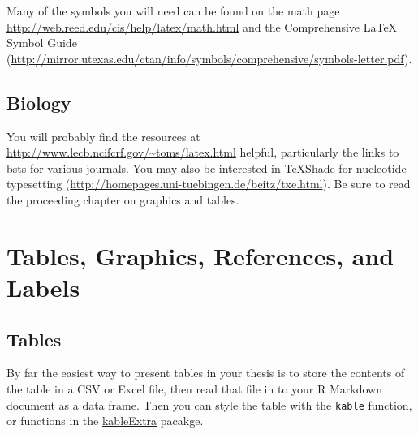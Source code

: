 \documentclass [11pt, proquest] {uwthesis}[2015/03/03]
\begin{document}
Many of the symbols you will need can be found on the math page \url{http://web.reed.edu/cis/help/latex/math.html} and the Comprehensive LaTeX Symbol Guide (\url{http://mirror.utexas.edu/ctan/info/symbols/comprehensive/symbols-letter.pdf}).

\hypertarget{biology}{%
\section{Biology}\label{biology}}

You will probably find the resources at \url{http://www.lecb.ncifcrf.gov/~toms/latex.html} helpful, particularly the links to bsts for various journals. You may also be interested in TeXShade for nucleotide typesetting (\url{http://homepages.uni-tuebingen.de/beitz/txe.html}). Be sure to read the proceeding chapter on graphics and tables.

\hypertarget{ref-labels}{%
\chapter{Tables, Graphics, References, and Labels}\label{ref-labels}}

\hypertarget{tables}{%
\section{Tables}\label{tables}}

By far the easiest way to present tables in your thesis is to store the contents of the table in a CSV or Excel file, then read that file in to your R Markdown document as a data frame. Then you can style the table with the \texttt{kable} function, or functions in the \href{https://cran.r-project.org/web/packages/kableExtra/index.html}{kableExtra} pacakge.
\end{document}
